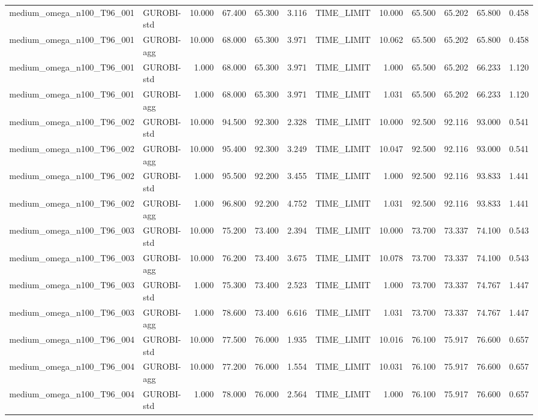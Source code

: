\begin{table}[htbp]
\begin{tabular}{llrrrrlrrrrr}
medium\_omega\_n100\_T96\_001 & GUROBI-std & 10.000 & 67.400 & 65.300 & 3.116 & TIME\_LIMIT & 10.000 & 65.500 & 65.202 & 65.800 & 0.458 \\
medium\_omega\_n100\_T96\_001 & GUROBI-agg & 10.000 & 68.000 & 65.300 & 3.971 & TIME\_LIMIT & 10.062 & 65.500 & 65.202 & 65.800 & 0.458 \\
medium\_omega\_n100\_T96\_001 & GUROBI-std & 1.000 & 68.000 & 65.300 & 3.971 & TIME\_LIMIT & 1.000 & 65.500 & 65.202 & 66.233 & 1.120 \\
medium\_omega\_n100\_T96\_001 & GUROBI-agg & 1.000 & 68.000 & 65.300 & 3.971 & TIME\_LIMIT & 1.031 & 65.500 & 65.202 & 66.233 & 1.120 \\
medium\_omega\_n100\_T96\_002 & GUROBI-std & 10.000 & 94.500 & 92.300 & 2.328 & TIME\_LIMIT & 10.000 & 92.500 & 92.116 & 93.000 & 0.541 \\
medium\_omega\_n100\_T96\_002 & GUROBI-agg & 10.000 & 95.400 & 92.300 & 3.249 & TIME\_LIMIT & 10.047 & 92.500 & 92.116 & 93.000 & 0.541 \\
medium\_omega\_n100\_T96\_002 & GUROBI-std & 1.000 & 95.500 & 92.200 & 3.455 & TIME\_LIMIT & 1.000 & 92.500 & 92.116 & 93.833 & 1.441 \\
medium\_omega\_n100\_T96\_002 & GUROBI-agg & 1.000 & 96.800 & 92.200 & 4.752 & TIME\_LIMIT & 1.031 & 92.500 & 92.116 & 93.833 & 1.441 \\
medium\_omega\_n100\_T96\_003 & GUROBI-std & 10.000 & 75.200 & 73.400 & 2.394 & TIME\_LIMIT & 10.000 & 73.700 & 73.337 & 74.100 & 0.543 \\
medium\_omega\_n100\_T96\_003 & GUROBI-agg & 10.000 & 76.200 & 73.400 & 3.675 & TIME\_LIMIT & 10.078 & 73.700 & 73.337 & 74.100 & 0.543 \\
medium\_omega\_n100\_T96\_003 & GUROBI-std & 1.000 & 75.300 & 73.400 & 2.523 & TIME\_LIMIT & 1.000 & 73.700 & 73.337 & 74.767 & 1.447 \\
medium\_omega\_n100\_T96\_003 & GUROBI-agg & 1.000 & 78.600 & 73.400 & 6.616 & TIME\_LIMIT & 1.031 & 73.700 & 73.337 & 74.767 & 1.447 \\
medium\_omega\_n100\_T96\_004 & GUROBI-std & 10.000 & 77.500 & 76.000 & 1.935 & TIME\_LIMIT & 10.016 & 76.100 & 75.917 & 76.600 & 0.657 \\
medium\_omega\_n100\_T96\_004 & GUROBI-agg & 10.000 & 77.200 & 76.000 & 1.554 & TIME\_LIMIT & 10.031 & 76.100 & 75.917 & 76.600 & 0.657 \\
medium\_omega\_n100\_T96\_004 & GUROBI-std & 1.000 & 78.000 & 76.000 & 2.564 & TIME\_LIMIT & 1.000 & 76.100 & 75.917 & 76.600 & 0.657 \\

\end{tabular}
\end{table}
